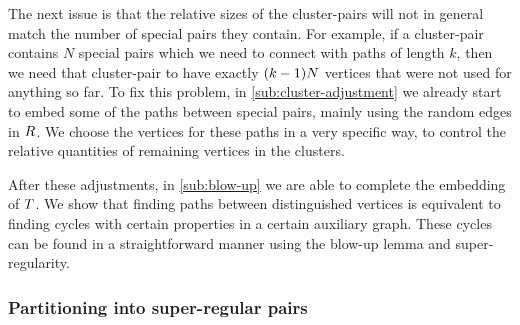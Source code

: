 \documentclass[11pt,english]{article}
\theoremstyle{plain}
\theoremstyle{plain}
\theoremstyle{plain}
\theoremstyle{plain}
\theoremstyle{plain}
\theoremstyle{definition}
\theoremstyle{definition}
\theoremstyle{remark}
\theoremstyle{remark}
\theoremstyle{plain}
\theoremstyle{definition}
\theoremstyle{definition}
\theoremstyle{plain}
\theoremstyle{plain}
\theoremstyle{plain}
\theoremstyle{plain}
\theoremstyle{remark}
\theoremstyle{plain}
\theoremstyle{definition}
\let\originalleft\left
\let\originalright\right
\renewcommand{\left}{\mathopen{}\mathclose\bgroup\originalleft}
\renewcommand{\right}{\aftergroup\egroup\originalright}
\begin{document}
The next issue is that the relative sizes of the cluster-pairs will
not in general match the number of special pairs they contain. For
example, if a cluster-pair contains $N$ special pairs which we need
to connect with paths of length $k$, then we need that cluster-pair
to have exactly $\left(k-1\right)N$ vertices that were not used for
anything so far. To fix this problem, in \ref{sub:cluster-adjustment}
we already start to embed some of the paths between special pairs,
mainly using the random edges in $R$. We choose the vertices for
these paths in a very specific way, to control the relative quantities
of remaining vertices in the clusters.

After these adjustments, in \ref{sub:blow-up} we are able to complete
the embedding of $T$. We show that finding paths between distinguished
vertices is equivalent to finding cycles with certain properties in
a certain auxiliary graph. These cycles can be found in a straightforward
manner using the blow-up lemma and super-regularity.


\subsubsection{Partitioning into super-regular pairs\label{sub:partition-into-blobs}}
\end{document}
